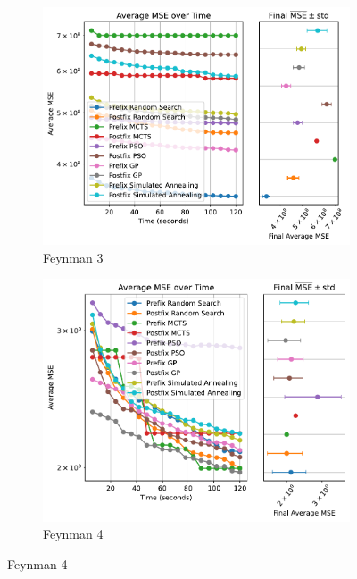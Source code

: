\documentclass[runningheads]{llncs}
\begin{document}
\begin{figure}
    \begin{subfigure}[b]{0.49\textwidth}
        \includegraphics[width=\linewidth, keepaspectratio]{AIFeynman_Benchmarks/Feynman_Benchmark_3.pdf}
        \caption{Feynman 3}
        \label{subfig:feynman_3}
    \end{subfigure}
    \begin{subfigure}[b]{0.49\textwidth}
        \includegraphics[width=\linewidth, keepaspectratio]{AIFeynman_Benchmarks/Feynman_Benchmark_4.pdf}
        \caption{Feynman 4}
        \label{subfig:feynman_4}
    \end{subfigure}
    

\end{figure}
\end{document}
